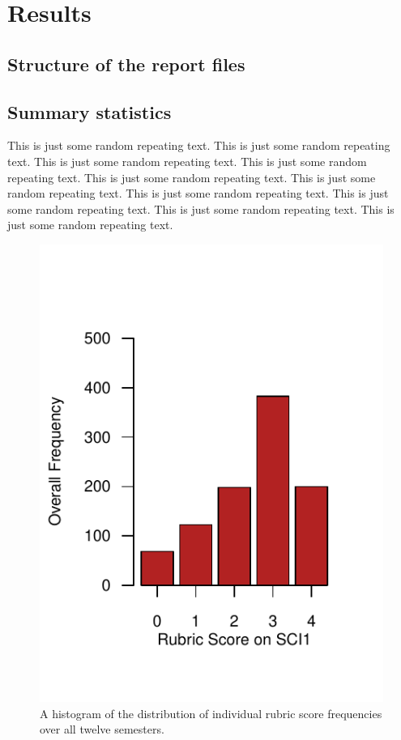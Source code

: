 \documentclass[fleqn,10pt]{SelfArx}\usepackage[]{graphicx}\usepackage[]{color}
\begin{document}
\section{Results}
\lipsum[1]

\subsection{Structure of the report files}
\lipsum[1]

\subsection{Summary statistics}
This is just some random repeating text. This is just some random repeating text. This is just some random repeating text. This is just some random repeating text. This is just some random repeating text. This is just some random repeating text. This is just some random repeating text. This is just some random repeating text. This is just some random repeating text. This is just some random repeating text.

\begin{figure}[h]\centering

\includegraphics[width=\columnwidth,viewport = 0 20 216 240]{./figure/histogram}
\protect\caption{A histogram of the distribution of individual rubric score frequencies over all twelve semesters.}
\label{fig:histogram}
\end{figure}
\end{document}
